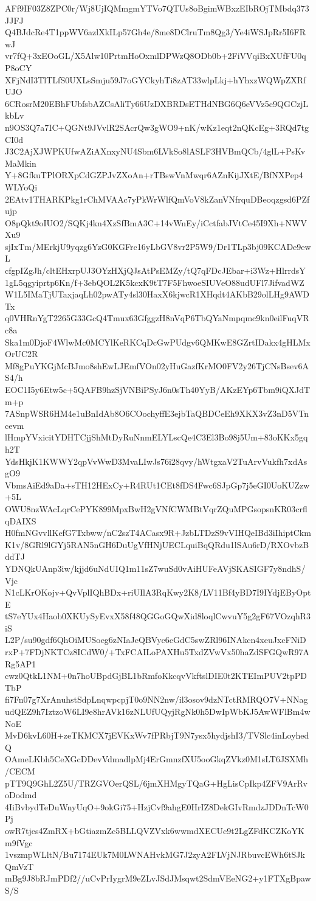 AFf9IF03Z8ZPC0r/Wj8UjIQMmgmYTVo7QTUs8oBgimWBxzEIbROjTMbdq373JJFJ
Q4BJdcRe4T1ppWV6azlXkILp57Gh4e/8me8DClruTm8Qg3/Ye4iWSJpRr5I6FRwJ
vr7fQ+3xEOoGL/X5Alw10PrtmHoOxmlDPWzQ8ODb0b+2FiVVqiBxXUfFU0qP8oCY
XFjNdI3TlTLfS0UXLsSmju59J7oGYCkyhTi8zAT33wlpLkj+hYhxzWQWpZXRfUJO
6CRosrM20EBhFUbfsbAZCsAliTy66UzDXBRDsETHdNBG6Q6eVVz5c9QGCzjLkbLv
n9OS3Q7a7IC+QGNt9JVvlR2SAcrQw3gWO9+nK/wKz1eqt2nQKcEg+3RQd7tgCI0d
J3C2AjXJWPKUfwAZiAXnxyNU4Sbm6LVkSo8lASLF3HVBmQCb/4glL+PsKvMaMkin
Y+8GfkuTPlORXpCdGZPJvZXoAn+rTBswVnMwqr6AZnKijJXtE/BfNXPep4WLYoQi
2EAtv1THARKPkg1rChMVAAc7yPkWrWlfQmVoV8kZanVNfrquDBeoqzgsd6PZfujp
O8pQkt9oIUO2/SQKj4kn4XzSfBmA3C+14vWnEy/iCctfabJVtCe45I9Xh+NWVXu9
sjIxTm/MErkjU9yqzg6YzG0KGFrc16yLbGV8vr2P5W9/Dr1TLp3bj09KCADe9ewL
cfgpIZgJh/cltEHxrpUJ3OYzHXjQJsAtPsEMZy/tQ7qFDcJEbar+i3Wz+HlrrdsY
1gL5qgyiprtp6Kn/f+3ebQOL2K5kcxK9tT7F5FhwoeSIUVeO88udUFl7JifvadWZ
W1L5IMaTjUTaxjaqLh02pwATy4sl30HaxX6kjwcR1XHqdt4AKbB29olLHg9AWDTx
q0VHRnYgT2265G33GcQ4Tmux63GfggzH8nVqP6TbQYaNmpqmc9kn0eilFuqVRc8a
Ska1m0DjoF4WlwMc0MCYlKeRKCqDcGwPUdgv6QMKwE8GZrtIDakx4gHLMxOrUC2R
Mf8gPuYKGjMcBJmo8shEwLJEmfVOn02yHuGazfKrMO0FV2y26TjCNsBsev6AS4/h
EOC1I5y6Etw5c+5QAFB9hzSjVNBiPSyJ6n0sTh40YyB/AKzEYp6Tbm9iQXJdTm+p
7ASnpWSR6HM4e1uBnIdAb8O6COochyffE3ejbTaQBDCeEh9XKX3vZ3nD5VTncevm
lHmpYVxicitYDHTCjjShMtDyRuNnmELYLscQe4C3El3Bo98j5Um+83oKKx5gqh2T
YdsHkjK1KWWY2qpVvWwD3MvaLIwJs76i28qvy/hWtgxaV2TuArvVukfh7xdAsgO9
VbmsAiEd9aDa+sTH12HExCy+R4RUt1CEt8fDS4Fwc6SJpGp7j5eGI0UoKUZzw+5L
OWU8nzWAcLqrCePYK899MpxBwH2gVNfCWMBtVqrZQuMPGsopsnKR03crflqDAIXS
H0fmNGvvllKefG7Txbww/nC2szT4ACasx9R+JzbLTDzS9vVIHQeIBd3iIhiptCkm
K1v/8GRl9lGYj5RAN5nGH6DuUgVfHNjUECLquiBqQRdu1lSAu6rD/RXOvbzBddTJ
YDNQkUAnp3iw/kjjd6uNdUIQ1m11sZ7wuSd0vAiHUFeAVjSKASIGF7y8ndhS/Vjc
N1cLKrOKojv+QvVplIQhBDx+riUIlA3RqKwy2K8/LV11Bf4yBD7I9IYdjEByOptE
tS7eYUx4Haob0XKUySyEvxX58f48QGGoGQwXid8loqlCwvuY5g2gF67VOzqhR3iS
L2P/su90gdf6QhOiMUSoeg6zNIaJeQBVyc6cGdC5swZRl96INAkcn4xeuJxcFNiD
rxP+7FDjNKTCz8ICdW0/+TxFCAILoPAXHu5TxdZVwVx50haZdSFGQwR97ARg5AP1
cwz0QtkL1NM+0n7hoUBpdGjBL1bRmfoKkcqvVkftslDIE0t2KTEImPUV2tpPDTbP
fi7Fn07g7XrAnuhstSdpLnqwpcpjT0o9NN2nw/il3osov9dzNTctRMRQO7V+NNag
udQEZ9h7IztzoW6LI9e8hrAVk16zNLUfUQyjRgNk0h5DwIpWbKJ5AwWFlBm4wNoE
MvD6kvL60H+zeTKMCX7jEVKxWv7fPRbjT9N7ysx5hydjshI3/TVSlc4inLoyhedQ
OAmeLKbh5CeXGcDDevVdmadlpMj4ErGmnzfXU5ooGkqZVkz0M1sLT6JSXMh/CECM
pTT9Q9GhL2Z5U/TRZGVOerQSL/6jmXHMgyTQaG+HgLisCpIkp4ZFV9ArRvoDodmd
4IiBvbydTeDuWnyUqO+9okGi75+HzjCvf9ahgE0HrIZ8DekGIvRmdzJDDnTcW0Pj
owR7tjes4ZmRX+bGtiazmZc5BLLQVZVxk6wwmdXECUc9t2LgZFdKCZKoYKm9fVgc
1vszmpWLltN/Bu7174EUk7M0LWNAHvkMG7J2zyA2FLVjNJRbuvcEWh6tSJkQmVzT
mBg9J8bRJmPDf2//uCvPrIygrM9eZLvJSdJMsqwt2SdmVEeNG2+y1FTXgBpawS/S
